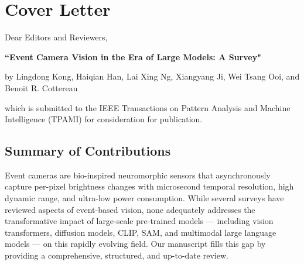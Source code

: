 \documentclass{article}
\begin{document}
\section*{Cover Letter}

Dear Editors and Reviewers,

\vspace{0.2cm}

\textbf{``Event Camera Vision in the Era of Large Models: A Survey"}

by Lingdong Kong, Haiqian Han, Lai Xing Ng, Xiangyang Ji, Wei Tsang Ooi, and Benoit R. Cottereau

which is submitted to the IEEE Transactions on Pattern Analysis and Machine Intelligence (TPAMI) for consideration for publication.


\subsection*{Summary of Contributions}

Event cameras are bio-inspired neuromorphic sensors that asynchronously capture per-pixel brightness changes with microsecond temporal resolution, high dynamic range, and ultra-low power consumption. While several surveys have reviewed aspects of event-based vision, none adequately addresses the transformative impact of large-scale pre-trained models --- including vision transformers, diffusion models, CLIP, SAM, and multimodal large language models --- on this rapidly evolving field. Our manuscript fills this gap by providing a comprehensive, structured, and up-to-date review.
\end{document}
